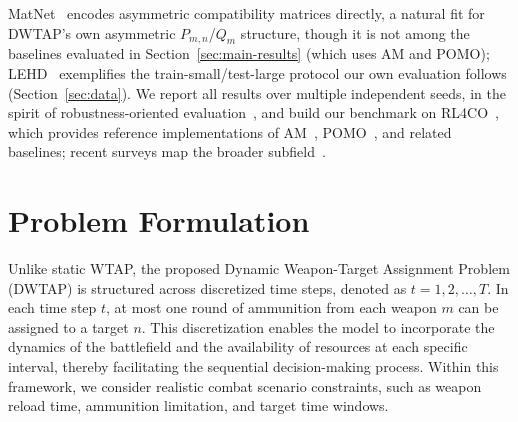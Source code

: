 MatNet~\cite{kwon2021matrix} encodes asymmetric compatibility matrices directly, a natural fit for DWTAP's own asymmetric $P_{m,n}$/$Q_m$ structure, though it is not among the baselines evaluated in Section~\ref{sec:main-results} (which uses AM and POMO); LEHD~\cite{luo2023lehd} exemplifies the train-small/test-large protocol our own evaluation follows (Section~\ref{sec:data}).
We report all results over multiple independent seeds, in the spirit of robustness-oriented evaluation~\cite{grinsztajn2023winner}, and build our benchmark on RL4CO~\cite{berto2023rl4co}, which provides reference implementations of AM~\cite{kool2018attention}, POMO~\cite{kwon2020pomo}, and related baselines; recent surveys map the broader subfield~\cite{mazyavkina2021reinforcement,bogyrbayeva2024survey}.

\section{Problem Formulation}
\label{sec:problem}

Unlike static WTAP, the proposed Dynamic Weapon-Target Assignment Problem (DWTAP) is structured across discretized time steps, denoted as $t = 1, 2, \ldots, T$. In each time step $t$, at most one round of ammunition from each weapon $m$ can be assigned to a target $n$. This discretization enables the model to incorporate the dynamics of the battlefield and the availability of resources at each specific interval, thereby facilitating the sequential decision-making process. Within this framework, we consider realistic combat scenario constraints, such as weapon reload time, ammunition limitation, and target time windows.

